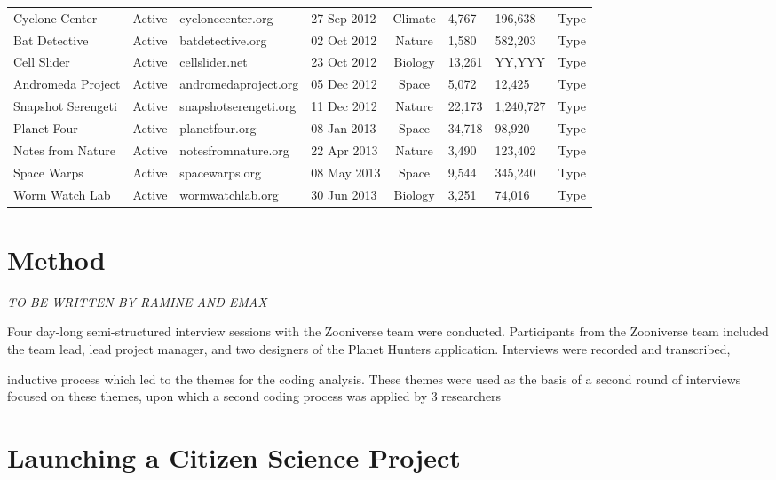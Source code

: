 \documentclass{sigchi}
\begin{document}
\begin{table*}
\begin{center}
\begin{tabular}{lcllclll}
Cyclone Center & Active & cyclonecenter.org & 27 Sep 2012 & Climate & 4,767 & 196,638 & Type \\
Bat Detective & Active & batdetective.org & 02 Oct 2012 & Nature & 1,580 & 582,203 & Type \\
Cell Slider & Active & cellslider.net & 23 Oct 2012 & Biology & 13,261 & YY,YYY & Type \\
Andromeda Project & Active & andromedaproject.org & 05 Dec 2012 & Space & 5,072 & 12,425 & Type \\
Snapshot Serengeti & Active & snapshotserengeti.org & 11 Dec 2012 & Nature & 22,173 & 1,240,727 & Type \\
Planet Four & Active & planetfour.org & 08 Jan 2013 & Space & 34,718 & 98,920 & Type \\
Notes from Nature & Active & notesfromnature.org & 22 Apr 2013 & Nature & 3,490 & 123,402 & Type \\
Space Warps & Active & spacewarps.org & 08 May 2013 & Space & 9,544 & 345,240 & Type \\
Worm Watch Lab & Active & wormwatchlab.org & 30 Jun 2013 & Biology & 3,251 & 74,016 & Type \\

\end{tabular}
\end{center}
\label{project-summary}
\end{table*}

\section{Method}

\emph{TO BE WRITTEN BY RAMINE AND EMAX}

Four day-long semi-structured interview sessions with the Zooniverse
team were conducted. Participants from the Zooniverse team included
the team lead, lead project manager, and two designers of the Planet
Hunters application.  Interviews were recorded and transcribed,

inductive process which led to the themes for the coding analysis.
These themes were used as the basis of a second round of interviews
focused on these themes, upon which a second coding process was
applied by 3 researchers

\section{Launching a Citizen Science Project}
\end{document}
